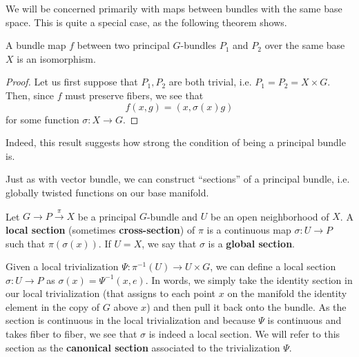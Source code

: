 We will be concerned primarily with maps between bundles with the same base space. This is quite a special case, as the following theorem shows.
\begin{thm}
    A bundle map $f$ between two principal $G$-bundles $P_1$ and $P_2$ over the same base $X$ is an isomorphism.
\end{thm}
\begin{proof}
    Let us first suppose that $P_1,P_2$ are both trivial, i.e. $P_1=P_2=X\times G$. Then, since $f$ must preserve fibers, we see that
    \[f(x,g)=(x,\sigma(x)g)\]
    for some function $\sigma:X\to G$.
\end{proof}
Indeed, this result suggests how strong the condition of being a principal bundle is.



Just as with vector bundle, we can construct ``sections'' of a principal bundle, i.e. globally twisted functions on our base manifold.

\begin{defn}
    Let $G\to P\overset{\pi}{\to} X$ be a principal $G$-bundle and $U$ be an open neighborhood of $X$. A \textbf{local section} (sometimes \textbf{cross-section}) of $\pi$ is a continuous map $\sigma: U\to P$ such that $\pi(\sigma(x))$. If $U=X$, we say that $\sigma$ is a \textbf{global section}.
\end{defn}

\begin{exmp}
    Given a local trivialization $\Psi:\pi^{-1}(U)\to U\times G$, we can define a local section $\sigma:U\to P$ as $\sigma(x)=\Psi^{-1}(x,e)$. In words, we simply take the identity section in our local trivialization (that assigns to each point $x$ on the manifold the identity element in the copy of $G$ above $x$) and then pull it back onto the bundle. As the section is continuous in the local trivialization and because $\Psi$ is continuous and takes fiber to fiber, we see that $\sigma$ is indeed a local section. We will refer to this section as the \textbf{canonical section} associated to the trivialization $\Psi$.
\end{exmp}

